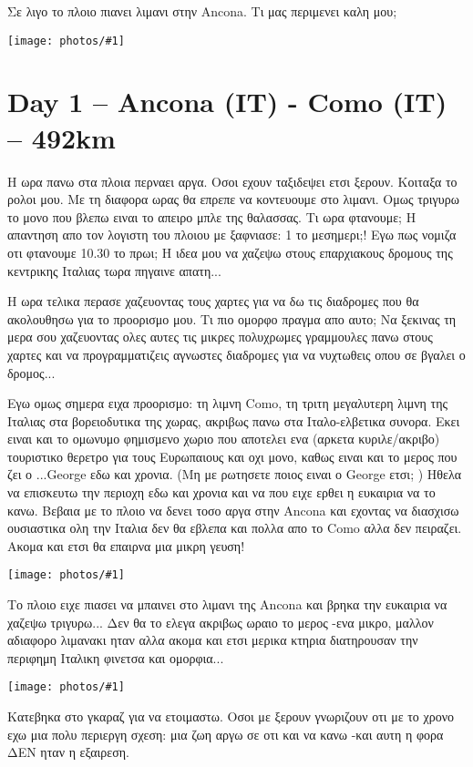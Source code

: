 \documentclass[]{book}
\newcommand\photo[1]{\noindent\texttt{[image: photos/\#1]}}
\begin{document}
Σε λιγο το πλοιο πιανει λιμανι στην Ancona. Τι μας περιμενει καλη μου;

\photo{5.jpg}

\chapter*{Day 1 -- Ancona (IT) - Como (IT) -- 492km}

Η ωρα πανω στα πλοια περναει αργα. Οσοι εχουν ταξιδεψει ετσι ξερουν. Κοιταξα το ρολοι μου. Με τη διαφορα ωρας θα επρεπε να κοντευουμε στο λιμανι. Ομως τριγυρω το μονο που βλεπω ειναι το απειρο μπλε της θαλασσας. Τι ωρα φτανουμε; Η απαντηση απο τον λογιστη του πλοιου με ξαφνιασε: 1 το μεσημερι;! Εγω πως νομιζα οτι φτανουμε 10.30 το πρωι; Η ιδεα μου να χαζεψω στους επαρχιακους δρομους της κεντρικης Ιταλιας τωρα πηγαινε απατη...

Η ωρα τελικα περασε χαζευοντας τους χαρτες για να δω τις διαδρομες που θα ακολουθησω για το προορισμο μου. Τι πιο ομορφο πραγμα απο αυτο; Να ξεκινας τη μερα σου χαζευοντας ολες αυτες τις μικρες πολυχρωμες γραμμουλες πανω στους χαρτες και να προγραμματιζεις αγνωστες διαδρομες για να νυχτωθεις οπου σε βγαλει ο δρομος...

Εγω ομως σημερα ειχα προορισμο: τη λιμνη Como, τη τριτη μεγαλυτερη λιμνη της Ιταλιας στα βορειοδυτικα της χωρας, ακριβως πανω στα Ιταλο-ελβετικα συνορα. Εκει ειναι και το ομωνυμο φημισμενο χωριο που αποτελει ενα (αρκετα κυριλε/ακριβο) τουριστικο θερετρο για τους Ευρωπαιους και οχι μονο, καθως ειναι και το μερος που ζει ο ...George εδω και χρονια. (Μη με ρωτησετε ποιος ειναι ο George ετσι; )
Ηθελα να επισκευτω την περιοχη εδω και χρονια και να που ειχε ερθει η ευκαιρια να το κανω. Βεβαια με το πλοιο να δενει τοσο αργα στην Ancona και εχοντας να διασχισω ουσιαστικα ολη την Ιταλια δεν θα εβλεπα και πολλα απο το Como αλλα δεν πειραζει. Ακομα και ετσι θα επαιρνα μια μικρη γευση!

\photo{6.jpg}

Το πλοιο ειχε πιασει να μπαινει στο λιμανι της Ancona και βρηκα την ευκαιρια να χαζεψω τριγυρω...
Δεν θα το ελεγα ακριβως ωραιο το μερος -ενα μικρο, μαλλον αδιαφορο λιμανακι ηταν αλλα ακομα και ετσι μερικα κτηρια διατηρουσαν την περιφημη Ιταλικη φινετσα και ομορφια...

\photo{7.jpg}

Κατεβηκα στο γκαραζ για να ετοιμαστω. Οσοι με ξερουν γνωριζουν οτι με το χρονο εχω μια πολυ περιεργη σχεση: μια ζωη αργω σε οτι και να κανω -και αυτη η φορα ΔΕΝ ηταν η εξαιρεση.
\end{document}
